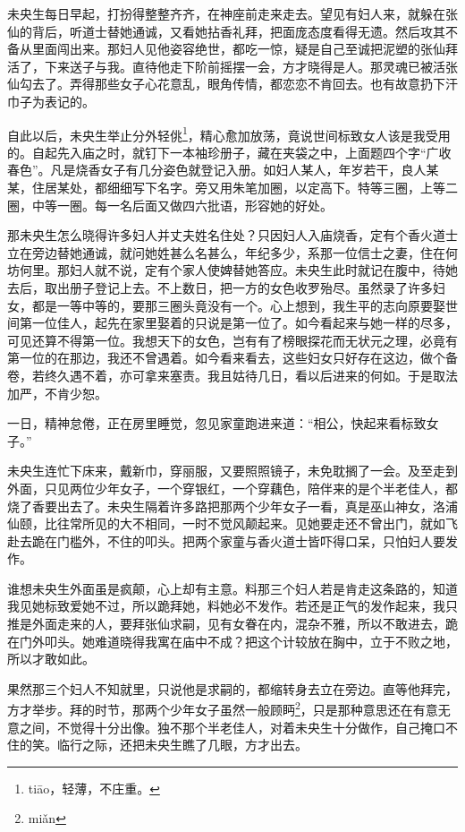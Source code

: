 \documentclass[a4paper,12pt,UTF8,twoside]{ctexbook}
\begin{document}
未央生每日早起，打扮得整整齐齐，在神座前走来走去。望见有妇人来，就躲在张仙的背后，听道士替她通诚，又看她拈香礼拜，把面庞态度看得无遗。然后攻其不备从里面闯出来。那妇人见他姿容绝世，都吃一惊，疑是自己至诚把泥塑的张仙拜活了，下来送子与我。直待他走下阶前摇摆一会，方才晓得是人。那灵魂已被活张仙勾去了。弄得那些女子心花意乱，眼角传情，都恋恋不肯回去。也有故意扔下汗巾子为表记的。

自此以后，未央生举止分外轻佻\footnote{ti\=ao，轻薄，不庄重。}，精心愈加放荡，竟说世间标致女人该是我受用的。自起先入庙之时，就钉下一本袖珍册子，藏在夹袋之中，上面题四个字“广收春色”。凡是烧香女子有几分姿色就登记入册。如妇人某人，年岁若干，良人某某，住居某处，都细细写下名字。旁又用朱笔加圈，以定高下。特等三圈，上等二圈，中等一圈。每一名后面又做四六批语，形容她的好处。

那未央生怎么晓得许多妇人并丈夫姓名住处？只因妇人入庙烧香，定有个香火道士立在旁边替她通诚，就问她姓甚么名甚么，年纪多少，系那一位信士之妻，住在何坊何里。那妇人就不说，定有个家人使婢替她答应。未央生此时就记在腹中，待她去后，取出册子登记上去。不上数日，把一方的女色收罗殆尽。虽然录了许多妇女，都是一等中等的，要那三圈头竟没有一个。心上想到，我生平的志向原要娶世间第一位佳人，起先在家里娶着的只说是第一位了。如今看起来与她一样的尽多，可见还算不得第一位。我想天下的女色，岂有有了榜眼探花而无状元之理，必竟有第一位的在那边，我还不曾遇着。如今看来看去，这些妇女只好存在这边，做个备卷，若终久遇不着，亦可拿来塞责。我且姑待几日，看以后进来的何如。于是取法加严，不肯少恕。

一日，精神怠倦，正在房里睡觉，忽见家童跑进来道：“相公，快起来看标致女子。”

未央生连忙下床来，戴新巾，穿丽服，又要照照镜子，未免耽搁了一会。及至走到外面，只见两位少年女子，一个穿银红，一个穿藕色，陪伴来的是个半老佳人，都烧了香要出去了。未央生隔着许多路把那两个少年女子一看，真是巫山神女，洛浦仙颐，比往常所见的大不相同，一时不觉风颠起来。见她要走还不曾出门，就如飞赴去跪在门槛外，不住的叩头。把两个家童与香火道士皆吓得口呆，只怕妇人要发作。

谁想未央生外面虽是疯颠，心上却有主意。料那三个妇人若是肯走这条路的，知道我见她标致爱她不过，所以跪拜她，料她必不发作。若还是正气的发作起来，我只推是外面走来的人，要拜张仙求嗣，见有女眷在内，混杂不雅，所以不敢进去，跪在门外叩头。她难道晓得我寓在庙中不成？把这个计较放在胸中，立于不败之地，所以才敢如此。

果然那三个妇人不知就里，只说他是求嗣的，都缩转身去立在旁边。直等他拜完，方才举步。拜的时节，那两个少年女子虽然一般顾眄\footnote{mi\v{a}n}，只是那种意思还在有意无意之间，不觉得十分出像。独不那个半老佳人，对着未央生十分做作，自己掩口不住的笑。临行之际，还把未央生瞧了几眼，方才出去。
\end{document}
